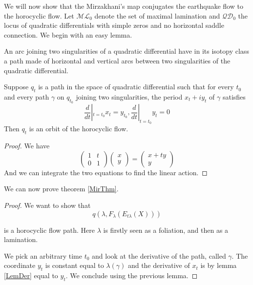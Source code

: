 We will now show that the Mirzakhani's map conjugates the earthquake flow to the horocyclic flow. Let $\mathcal{ML}_0$ denote the set of maximal lamination and $\mathcal{QD}_0$ the locus of quadratic differentials with simple zeros and no horizontal saddle connection. We begin with an easy lemma.

\begin{lem}
An arc joining two singularities of a quadratic differential have in its isotopy class a path made of horizontal and vertical arcs between two singularities of the quadratic differential.
\end{lem}

\begin{cor}
Suppose $q_t$ is a path in the space of quadratic differential such that for every $t_0$ and every path $\gamma$ on $q_{t_0}$ joining two singularities, the period $x_t + i y_t$ of $\gamma$ satisfies \[
\frac{d}{dt}|_{t=t_0} x_t = y_{t_0}, \frac{d}{dt}|_{t=t_0} y_t = 0
\]
Then $q_t$ is an orbit of the horocyclic flow.
\end{cor}

\begin{proof}
We have \[
\begin{pmatrix} 1 & t \\ 0 & 1 \end{pmatrix} \begin{pmatrix} x \\ y \end{pmatrix} = \begin{pmatrix} x + t y \\ y \end{pmatrix}
\]
And we can integrate the two equations to find the linear action.
\end{proof}

We can now prove theorem \ref{MirThm}.

\begin{proof}
We want to show that \[
q(\lambda,F_{\lambda}(E_{t \lambda}(X)))
\]

is a horocyclic flow path. Here $\lambda$ is firstly seen as a foliation, and then as a lamination.


 We pick an arbitrary time $t_0$ and look at the derivative of the path, called $\gamma$. The coordinate $y_t$ is constant equal to $\lambda(\gamma)$ and the derivative of $x_t$ is by lemma \ref{LemDer} equal to $y_t$. We conclude using the previous lemma.
\end{proof}
